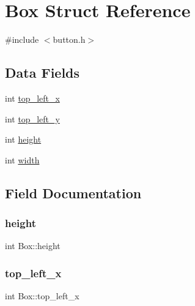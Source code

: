 \hypertarget{structBox}{}\section{Box Struct Reference}
\label{structBox}


{\ttfamily \#include $<$button.\+h$>$}

\subsection*{Data Fields}
\begin{DoxyCompactItemize}
\item 
int \hyperlink{structBox_a371cdeff5e760d631a593cc72c2442ff}{top\+\_\+left\+\_\+x}
\item 
int \hyperlink{structBox_a48eaa514b4e28a5349441c4d89e7e3f5}{top\+\_\+left\+\_\+y}
\item 
int \hyperlink{structBox_a6851eb8f64b4cbe58488f7dcfe04bdb8}{height}
\item 
int \hyperlink{structBox_a46c951fd4f07b46a726c8fc38013b0f0}{width}
\end{DoxyCompactItemize}


\subsection{Field Documentation}
\mbox{\label{structBox_a6851eb8f64b4cbe58488f7dcfe04bdb8}} 
\subsubsection{\texorpdfstring{height}{height}}
{\footnotesize\ttfamily int Box\+::height}

\mbox{\label{structBox_a371cdeff5e760d631a593cc72c2442ff}} 
\subsubsection{\texorpdfstring{top\+\_\+left\+\_\+x}{top\_left\_x}}
{\footnotesize\ttfamily int Box\+::top\+\_\+left\+\_\+x}

\mbox{\label{structBox_a48eaa514b4e28a5349441c4d89e7e3f5}} 
